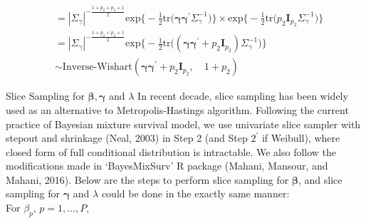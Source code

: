 \documentclass[a4paper, 12pt]{article}
\makeatletter
\renewcommand{\subsection}{\@startsection
	{subsection}    {2}    {0mm}    {-0.5\baselineskip}    {0.01\baselineskip}    {\normalfont\normalsize\itshape\center}}
\makeatother
\begin{document}
\begin{itemize}
\begin{equation*}
\begin{aligned}
		& = |\Sigma_{\gamma}|^{-\frac{1 + p_2 + p_2 +1}{2}}\mbox{exp}\Big\{-\frac{1}{2}\mbox{tr}\Big(\mathbf{\gamma}\mathbf{\gamma}^\prime \Sigma_{\gamma}^{-1}\Big)\Big\}\times \mbox{exp}\Big\{-\frac{1}{2}\mbox{tr}\Big(p_2 \mathbf{I}_{p_2}\Sigma_{\gamma}^{-1}\Big)\Big\}\\
		& = |\Sigma_{\gamma}|^{-\frac{1 + p_2  + p_2 +1}{2}}\mbox{exp}\Big\{-\frac{1}{2}\mbox{tr}\Big((\mathbf{\gamma}\mathbf{\gamma}^\prime + p_2 \mathbf{I}_{p_2})\Sigma_{\gamma}^{-1}\Big) \Big\}\\
		&\sim \mbox{Inverse-Wishart}(\mathbf{\gamma}\mathbf{\gamma}^\prime + p_2 \mathbf{I}_{p_2},\quad 1 + p_2)	
		\end{aligned}
		\end{equation*}
	\end{itemize} 
\subsection{Slice Sampling for $\mathbf{\beta}, \mathbf{\gamma}$ and $\lambda$}
\noindent In recent decade, slice sampling has been widely used as an alternative to Metropolis-Hastings algorithm. Following the current practice of Bayesian mixture survival model, we use univariate slice
sampler with stepout and shrinkage (Neal, 2003) in Step 2 (and Step $2^\prime$ if Weibull), where closed form of full conditional distribution is intractable. We also follow the modifications made in `BayesMixSurv' R package (Mahani, Mansour, and Mahani, 2016). Below are the steps to perform slice sampling for $\mathbf{\beta}$, and slice sampling for $\mathbf{\gamma}$ and $\lambda$ could be done in the exactly same manner:\\\newline
For ${\beta}_p$, $p=1,...,P,$
\end{document}
